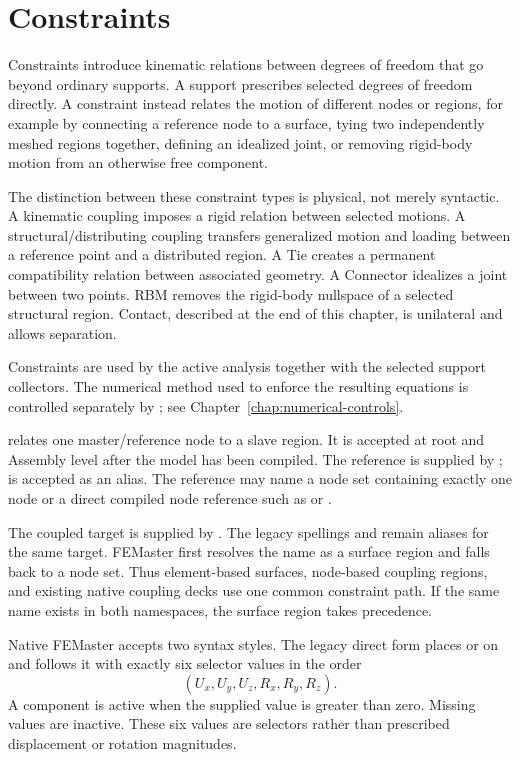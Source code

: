 \chapter{Constraints}
\label{chap:constraints}

Constraints introduce kinematic relations between degrees of freedom that go beyond ordinary supports. A support prescribes selected degrees of freedom directly. A constraint instead relates the motion of different nodes or regions, for example by connecting a reference node to a surface, tying two independently meshed regions together, defining an idealized joint, or removing rigid-body motion from an otherwise free component.

The distinction between these constraint types is physical, not merely syntactic. A kinematic coupling imposes a rigid relation between selected motions. A structural/distributing coupling transfers generalized motion and loading between a reference point and a distributed region. A Tie creates a permanent compatibility relation between associated geometry. A Connector idealizes a joint between two points. RBM removes the rigid-body nullspace of a selected structural region. Contact, described at the end of this chapter, is unilateral and allows separation.

Constraints are used by the active analysis together with the selected support collectors. The numerical method used to enforce the resulting equations is controlled separately by ; see Chapter~\ref{chap:numerical-controls}.


 relates one master/reference node to a slave region. It is accepted at root and Assembly level after the model has been compiled. The reference is supplied by ;  is accepted as an alias. The reference may name a node set containing exactly one node or a direct compiled node reference such as  or .

The coupled target is supplied by . The legacy spellings  and  remain aliases for the same target. FEMaster first resolves the name as a surface region and falls back to a node set. Thus element-based surfaces, node-based coupling regions, and existing native coupling decks use one common constraint path. If the same name exists in both namespaces, the surface region takes precedence.

Native FEMaster accepts two syntax styles. The legacy direct form places  or  on  and follows it with exactly six selector values in the order
\[
(U_x,U_y,U_z,R_x,R_y,R_z).
\]
A component is active when the supplied value is greater than zero. Missing values are inactive. These six values are selectors rather than prescribed displacement or rotation magnitudes.

